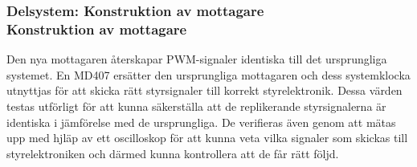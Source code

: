 \documentclass[a4paper]{article}
\begin{document}
\noindent

\subsubsection{Delsystem: Konstruktion av mottagare \\ Konstruktion av mottagare}
\vspace{5mm} \noindent
Den nya mottagaren återskapar PWM-signaler identiska till det ursprungliga systemet. En MD407 ersätter den ursprungliga mottagaren och dess systemklocka utnyttjas för att skicka rätt styrsignaler till korrekt styrelektronik. Dessa värden testas utförligt för att kunna säkerställa att de replikerande styrsignalerna är identiska i jämförelse med de ursprungliga. De verifieras även genom att mätas upp med hjläp av ett oscilloskop för att kunna veta vilka signaler som skickas till styrelektroniken och därmed kunna kontrollera att de får rätt följd.







\end{document}
